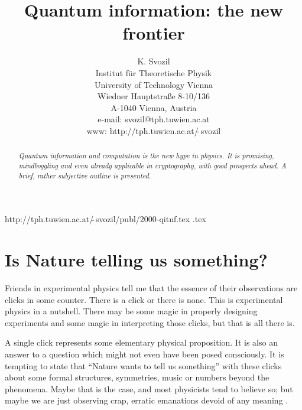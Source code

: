 \documentclass [11pt]{llncs}
\begin{document}
\title{Quantum information: the new frontier}
\author{K. Svozil\\
 {\small Institut f\"ur Theoretische Physik}  \\
  {\small University of Technology Vienna }     \\
  {\small Wiedner Hauptstra\ss e 8-10/136}    \\
  {\small A-1040 Vienna, Austria   }            \\
  {\small e-mail: svozil@tph.tuwien.ac.at}\\
  {\small www: http://tph.tuwien.ac.at/$\widetilde{\;}$svozil}}
\date{ }
\maketitle

\begin{flushright}
{\scriptsize
http://tph.tuwien.ac.at/$\widetilde{\;}$svozil/publ/2000-qitnf.tex
.tex}
\end{flushright}

\begin{abstract}
{\em
Quantum information and computation is the new hype in physics.
It is promising, mindboggling and even already applicable in cryptography,
with good prospects ahead.
A brief, rather subjective outline is presented.
}
\end{abstract}



\section{Is Nature telling us something?}

Friends in experimental physics tell me that the essence
of their observations are clicks in some
counter. There is a click or there is none.
This is experimental physics in a nutshell.
There may be some magic in properly designing experiments
and some magic in interpreting those clicks,
but that is all there is.

A single click represents some elementary physical proposition.
It is also an answer to a question which might not even have been posed consciously.
It is tempting to state that ``Nature wants to tell us something'' with these clicks about
some formal structures, symmetries, music or numbers beyond the phenomena.
Maybe that is the case, and most physicists tend to believe so;
but maybe we are just observing crap,
erratic emanations devoid of any meaning \cite{calude-meyerstein}.
\end{document}
